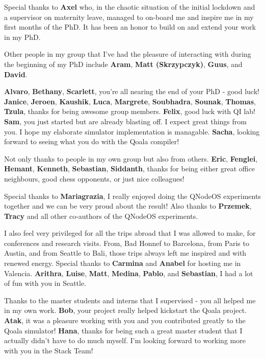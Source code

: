 Special thanks to \textbf{Axel} who, in the chaotic situation of the initial lockdown and a supervisor on maternity leave, managed to on-board me and inspire me in my first months of the PhD.
It has been an honor to build on and extend your work in my PhD.

Other people in my group that I've had the pleasure of interacting with during the beginning of my PhD include
\textbf{Aram}, \textbf{Matt (Skrzypczyk)}, \textbf{Guus}, and \textbf{David}.

\textbf{Alvaro}, \textbf{Bethany}, \textbf{Scarlett}, you're all nearing the end of your PhD - good luck!
\textbf{Janice}, \textbf{Jeroen}, \textbf{Kaushik}, \textbf{Luca}, \textbf{Margrete}, \textbf{Soubhadra}, \textbf{Sounak}, \textbf{Thomas}, \textbf{Tzula}, thanks for being awesome group members.
\textbf{Felix}, good luck with QI lab!
\textbf{Sam}, you just started but are already blasting off. I expect great things from you.
I hope my elaborate simulator implementation is managable.
\textbf{Sacha}, looking forward to seeing what you do with the Qoala compiler!

Not only thanks to people in my own group but also from others.
\textbf{Eric}, \textbf{Fenglei}, \textbf{Hemant}, \textbf{Kenneth}, \textbf{Sebastian}, \textbf{Siddanth}, thanks for being either great office neighbours, good chess opponents, or just nice colleagues!

Special thanks to \textbf{Mariagrazia}, I really enjoyed doing the QNodeOS experiments together and we can be very proud about the result!
Also thanks to \textbf{Przemek}, \textbf{Tracy} and all other co-authors of the QNodeOS experiments.

I also feel very privileged for all the trips abroad that I was allowed to make, for conferences and research visits.
From, Bad Honnef to Barcelona, from Paris to Austin, and from Seattle to Bali, those trips always left me inspired and with renewed energy.
Special thanks to \textbf{Carmina} and \textbf{Anabel} for hosting me in Valencia.
\textbf{Arithra}, \textbf{Luise}, \textbf{Matt}, \textbf{Medina}, \textbf{Pablo}, and \textbf{Sebastian}, I had a lot of fun with you in Seattle.

Thanks to the master students and interns that I supervised - you all helped me in my own work.
\textbf{Bob}, your project really helped kickstart the Qoala project.
\textbf{Atak}, it was a pleasure working with you and you contributed greatly to the Qoala simulator!
\textbf{Hana}, thanks for being such a great master student that I actually didn't have to do much myself.
I'm looking forward to working more with you in the Stack Team!

